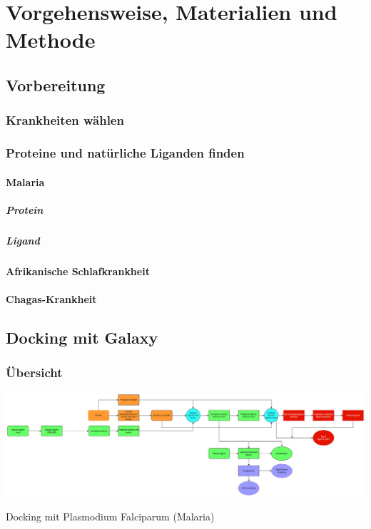 \documentclass[11pt]{article}
\begin{document}
{    \section{Vorgehensweise, Materialien und Methode}\label{sec:vorgehensweise-materialien-und-methode}

    \subsection{Vorbereitung}\label{subsec:vorbereitung}

    \subsubsection{Krankheiten wählen}

    \subsubsection{Proteine und natürliche Liganden finden}

    \paragraph{Malaria}

    \subparagraph{Protein}

    \subparagraph{Ligand}

    \paragraph{Afrikanische Schlafkrankheit}

    \paragraph{Chagas-Krankheit}

    \subsection{Docking mit Galaxy}\label{subsec:galaxy}

    \subsubsection{Übersicht}

    \includegraphics[width=\linewidth]{flowchart_Plasmodium Falciparum}
    \caption{Docking mit Plasmodium Falciparum (Malaria)}

}
\end{document}
